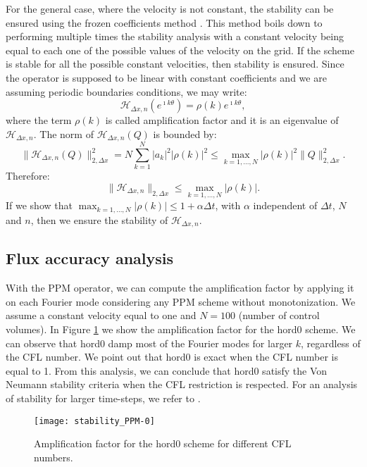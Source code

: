 For the general case, where the velocity is not constant, the stability
can be ensured using the frozen coefficients method \citep[p.~59]{strikwerda:2004}.
This method boils down to performing multiple times the stability analysis with a constant velocity
being equal to each one of the possible values of the velocity on the grid.
If the scheme is stable for all the possible constant velocities, then stability is ensured.
Since the operator is supposed to be linear with constant coefficients and we
are assuming periodic boundaries conditions, we may write:
\begin{equation*}
	\mathcal{H}_{\Delta x,n}(e^{\imath k \theta}) = \rho(k)  e^{\imath k \theta},
\end{equation*}
where the term $\rho(k)$ is called amplification factor and it is an eigenvalue of $\mathcal{H}_{\Delta x,n}$.
The norm of $\mathcal{H}_{\Delta x,n}(Q)$ is bounded by:
\begin{equation*}
	\|\mathcal{H}_{\Delta x,n}(Q)\|_{2,\Delta x}^2 = N \sum_{k=1}^{N} |a_k|^2 |\rho(k)|^2 \leq 
	\max_{k=1, \ldots, N}{|\rho(k)|}^2 \|Q\|_{2,\Delta x}^2.
\end{equation*}
Therefore:
\begin{equation*}
	\|\mathcal{H}_{\Delta x,n}\|_{2,\Delta x} \leq \max_{k=1, \ldots, N}{|\rho(k)|}.
\end{equation*}
If we show that $\max_{k=1, \ldots, N}{|\rho(k)|} \leq 1 + \alpha \Delta t$, 
with $\alpha$ independent of $\Delta t$, $N$ and $n$, then we ensure the stability of $\mathcal{H}_{\Delta x,n}$.

\subsection{Flux accuracy analysis}
\label{chp-adv1d-sub-flux}
With the PPM operator, we can compute the amplification factor by applying it
on each Fourier mode considering any PPM  scheme without monotonization.
We assume a constant velocity equal to one and $N=100$ (number of control volumes).
In Figure \ref{chp-adv1d-fig-amplification} we show the amplification factor for the hord0 scheme.
We can observe that hord0 damp most of the Fourier modes for larger $k$, regardless of the CFL number.
We point out that hord0 is exact when the CFL number is equal to 1.
From this analysis, we can conclude that hord0 satisfy the
Von Neumann stability criteria when the CFL restriction is respected.
For an analysis of stability for larger time-steps, we refer to \citet{lauritzen:2007}.
\begin{figure}[ht]
	\centering
	\texttt{[image: stability\_PPM-0]}
	\caption{Amplification factor for the hord0 scheme for different CFL numbers.}
	\label{chp-adv1d-fig-amplification}
\end{figure}

